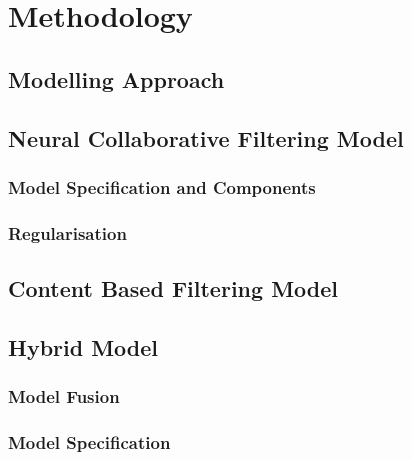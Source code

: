 
\chapter{Methodology} %

\label{Chapter4} %


\section{Modelling Approach}


\section{Neural Collaborative Filtering Model}


\subsection{Model Specification and Components}
\subsection{Regularisation}


\section{Content Based Filtering Model}



\section{Hybrid Model}
\subsection{Model Fusion}
\subsection{Model Specification}

